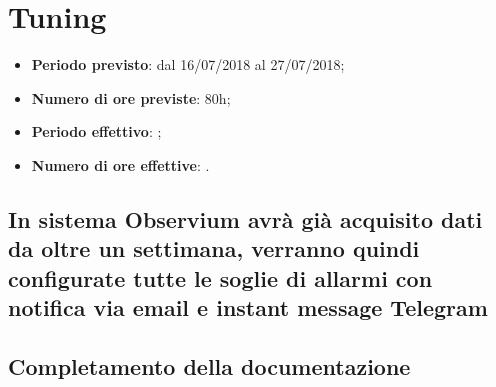 \documentclass[Realizzazione.tex]{subfiles}
\begin{document}
\section{Tuning}
\begin{itemize}
	\item \textbf{Periodo previsto}: dal 16/07/2018 al 27/07/2018;
	\item \textbf{Numero di ore previste}: 80h;
	\item \textbf{Periodo effettivo}: ;
	\item \textbf{Numero di ore effettive}: .
\end{itemize}
\subsection{In sistema Observium avrà già acquisito dati da oltre un settimana, verranno quindi configurate tutte le soglie di allarmi con notifica via email e instant message Telegram}
\subsection{Completamento della documentazione}
	
\end{document}
